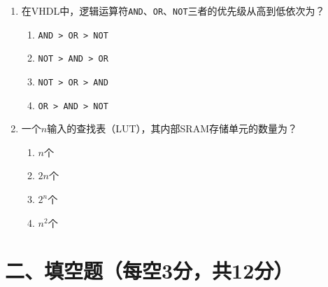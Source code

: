 \begin{enumerate}[label=\arabic*.]
\begin{enumerate}[label=\Alph*.]
  \item Moore型状态机的输出只与当前状态有关；Mealy型的输出与当前状态和输入均有关
  \item Moore型状态机需要更多状态；Mealy型一定更简单
  \item Mealy型状态机只能检测序列，Moore型只能控制输出
  \item Moore型状态机的输出比Mealy型延迟一个时钟周期，这是二者的\textbf{定义性}区别
\end{enumerate}

\item 在VHDL中，逻辑运算符\texttt{AND}、\texttt{OR}、\texttt{NOT}三者的优先级从高到低依次为？

\begin{enumerate}[label=\Alph*.]
  \item \texttt{AND > OR > NOT}
  \item \texttt{NOT > AND > OR}
  \item \texttt{NOT > OR > AND}
  \item \texttt{OR > AND > NOT}
\end{enumerate}

\item 一个$n$输入的查找表（LUT），其内部SRAM存储单元的数量为？

\begin{enumerate}[label=\Alph*.]
  \item $n$个
  \item $2n$个
  \item $2^n$个
  \item $n^2$个
\end{enumerate}

\end{enumerate}

\section*{二、填空题（每空3分，共12分）}

